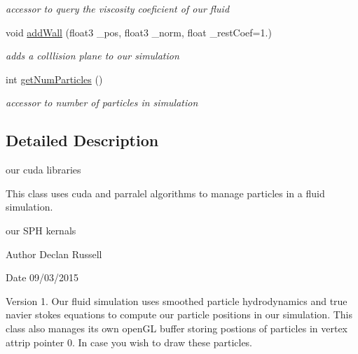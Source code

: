 \begin{DoxyCompactItemize}
\begin{DoxyCompactList}\small\item\em accessor to query the viscosity coeficient of our fluid \end{DoxyCompactList}\item 
void \hyperlink{class_s_p_h_engine_aa53becc41023eb45601eb3060860193a}{add\-Wall} (float3 \-\_\-pos, float3 \-\_\-norm, float \-\_\-rest\-Coef=1.)
\begin{DoxyCompactList}\small\item\em adds a colllision plane to our simulation \end{DoxyCompactList}\item 
\hypertarget{class_s_p_h_engine_a387ab48532ca20b2eb31319e862e243b}{int \hyperlink{class_s_p_h_engine_a387ab48532ca20b2eb31319e862e243b}{get\-Num\-Particles} ()}\label{class_s_p_h_engine_a387ab48532ca20b2eb31319e862e243b}

\begin{DoxyCompactList}\small\item\em accessor to number of particles in simulation \end{DoxyCompactList}\end{DoxyCompactItemize}


\subsection{Detailed Description}
our cuda libraries 

This class uses cuda and parralel algorithms to manage particles in a fluid simulation.

our S\-P\-H kernals

\begin{DoxyAuthor}{Author}
Declan Russell 
\end{DoxyAuthor}
\begin{DoxyDate}{Date}
09/03/2015 
\end{DoxyDate}
\begin{DoxyVersion}{Version}
1. Our fluid simulation uses smoothed particle hydrodynamics and true navier stokes equations to compute our particle positions in our simulation. This class also manages its own open\-G\-L buffer storing postions of particles in vertex attrip pointer 0. In case you wish to draw these particles. 
\end{DoxyVersion}



